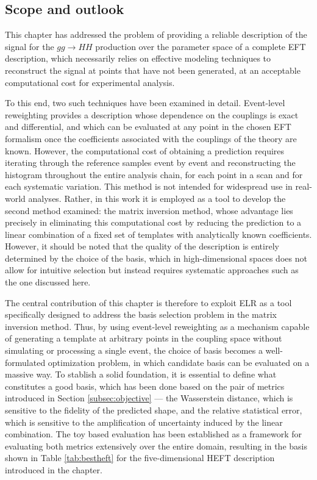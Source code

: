 \subsection{Scope and outlook}
\label{subsec:summary_outlook}
This chapter has addressed the problem of providing a reliable description of the signal for the $gg\to HH$ production over the parameter space of a complete EFT description, which necessarily relies on effective modeling techniques to reconstruct the signal at points that have not been generated, at an acceptable computational cost for experimental analysis.

To this end, two such techniques have been examined in detail. Event-level reweighting provides a description whose dependence on the couplings is exact and differential, and which can be evaluated at any point in the chosen EFT formalism once the coefficients associated with the couplings of the theory are known. However, the computational cost of obtaining a prediction requires iterating through the reference samples event by event and reconstructing the histogram throughout the entire analysis chain, for each point in a scan and for each systematic variation. This method is not intended for widespread use in real-world analyses. Rather, in this work it is employed as a tool to develop the second method examined: the matrix inversion method, whose advantage lies precisely in eliminating this computational cost by reducing the prediction to a linear combination of a fixed set of templates with analytically known coefficients. However, it should be noted that the quality of the description is entirely determined by the choice of the basis, which in high-dimensional spaces does not allow for intuitive selection but instead requires systematic approaches such as the one discussed here.

The central contribution of this chapter is therefore to exploit ELR as a tool specifically designed to address the basis selection problem in the matrix inversion method. Thus, by using event-level reweighting as a mechanism capable of generating a template at arbitrary points in the coupling space without simulating or processing a single event, the choice of basis becomes a well-formulated optimization problem, in which candidate basis can be evaluated on a massive way. To stablish a solid foundation, it is essential to define what constitutes a good basis, which has been done based on the pair of metrics introduced in Section \ref{subsec:objective} — the Wasserstein distance, which is sensitive to the fidelity of the predicted shape, and the relative statistical error, which is sensitive to the amplification of uncertainty induced by the linear combination. The toy based evaluation has been established as a framework for evaluating both metrics extensively over the entire domain, resulting in the basis shown in Table \ref{tab:bestheft} for the five-dimensional HEFT description introduced in the chapter.

